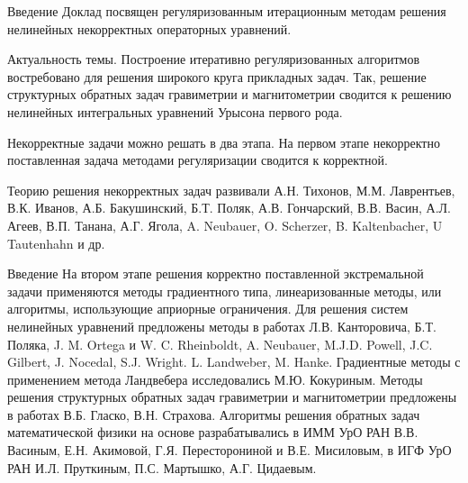 \documentclass[10pt,pdf, mathserif, hyperref={unicode}]{beamer}
\begin{document}
\begin{frame}{Введение}
	Доклад посвящен регуляризованным итерационным методам решения нелинейных некорректных операторных уравнений.
	
	\smallskip
	{\color{blue}Актуальность темы.} Построение итеративно регуляризованных алгоритмов востребовано для решения широкого круга прикладных задач. Так, решение структурных обратных задач гравиметрии и магнитометрии сводится к решению нелинейных интегральных уравнений Урысона первого рода.
	
	\smallskip
	Некорректные задачи можно решать в два этапа. На первом этапе некорректно поставленная задача методами регуляризации сводится к корректной.
	
	\smallskip
	Теорию решения некорректных задач развивали А.Н. Тихонов, М.М. Лаврентьев, В.К. Иванов, А.Б. Бакушинский, Б.Т. Поляк, А.В. Гончарский, В.В. Васин, А.Л. Агеев, В.П. Танана, А.Г. Ягола, A. Neubauer, O. Scherzer, B. Kaltenbacher, U Tautenhahn и др.
	
\end{frame}
\begin{frame}{Введение}
	На втором этапе решения корректно поставленной экстремальной задачи применяются методы градиентного типа, линеаризованные методы, или алгоритмы, использующие  априорные ограничения.
	Для решения систем нелинейных уравнений предложены методы в работах Л.В. Канторовича, Б.Т. Поляка, J. M. Ortega и W. C. Rheinboldt,	A. Neubauer, M.J.D. Powell, 	J.C. Gilbert, J. Nocedal, S.J. Wright.
	L. Landweber, M. Hanke. Градиентные методы с применением
	метода Ландвебера исследовались М.Ю. Кокуриным.
	Методы решения структурных обратных задач гравиметрии и магнитометрии предложены в работах В.Б. Гласко, В.Н. Страхова. Алгоритмы решения обратных задач
	математической физики на основе разрабатывались в ИММ УрО РАН В.В. Васиным, Е.Н. Акимовой, Г.Я. Пересторониной и В.Е. Мисиловым, в ИГФ УрО РАН И.Л. Пруткиным, П.С. Мартышко, А.Г. Цидаевым.
\end{frame}
\end{document}
